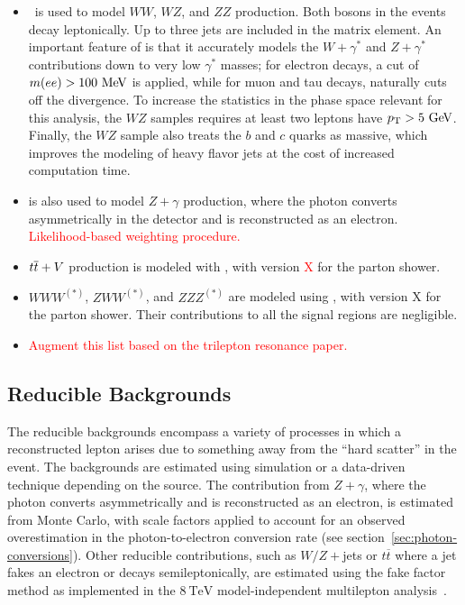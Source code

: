 \begin{itemize}
	\item \sherpa\ is used to model $WW$, $WZ$, and $ZZ$ production. Both bosons in the events decay leptonically. Up to three jets are included in the matrix element. An important feature of \sherpa is that it accurately models the $W+\gamma^{*}$ and $Z+\gamma^{*}$ contributions down to very low $\gamma^{*}$ masses; for electron decays, a cut of $m(ee)>100 \MeV$ is applied, while for muon and tau decays, \sherpa naturally cuts off the divergence. To increase the statistics in the phase space relevant for this analysis, the $WZ$ samples requires at least two leptons have $\pt>5 \GeV$. Finally, the $WZ$ sample also treats the $b$ and $c$ quarks as massive, which improves the modeling of heavy flavor jets at the cost of increased computation time. 

	\item \sherpa is also used to model $Z+\gamma$ production, where the photon converts asymmetrically in the detector and is reconstructed as an electron. \textcolor{red}{Likelihood-based weighting procedure.}

	\item $t\overline{t}+V$ production is modeled with \madgraph, with \pythia version \textcolor{red}{X} for the parton shower. 

	\item $WWW^{(*)}$, $ZWW^{(*)}$, and $ZZZ^{(*)}$ are modeled using \madgraph, with \pythia version X for the parton shower. Their contributions to all the signal regions are negligible.

	\item \textcolor{red}{Augment this list based on the trilepton resonance paper.}
\end{itemize}


\subsection{Reducible Backgrounds}
The reducible backgrounds encompass a variety of processes in which a reconstructed lepton arises due to something away from the ``hard scatter'' in the event. The backgrounds are estimated using simulation or a data-driven technique depending on the source. The contribution from $Z+\gamma$, where the photon converts asymmetrically and is reconstructed as an electron, is estimated from Monte Carlo, with scale factors applied to account for an observed overestimation in the photon-to-electron conversion rate (see section~\ref{sec:photon-conversions}). Other reducible contributions, such as $W/Z+$jets or $t\overline{t}$ where a jet fakes an electron or decays semileptonically, are estimated using the fake factor method as implemented in the $8~\mbox{TeV}$ model-independent multilepton analysis~\cite{DeViveiros:1670929}. 


